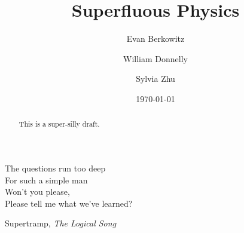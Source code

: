 \documentclass[aps,superscriptaddress,tightenlines,nofootinbib,floatfix,longbibliography]{revtex4-1}
\begin{document}
\title{Superfluous Physics}

\author{Evan Berkowitz}
\author{William Donnelly}
\author{Sylvia Zhu}

\date{\today}

\begin{abstract}
This is a super-silly draft.
\end{abstract}

\maketitle

\epigraph{The questions run too deep\\
For such a simple man\\
Won't you please, \\
Please tell me what we've learned?}{Supertramp, \textit{The Logical Song}}




\end{document}
